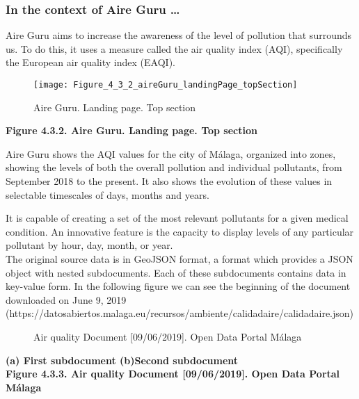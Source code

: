 \subsubsection*{In the context of Aire Guru \ldots} 

Aire Guru aims to increase the awareness of the level of pollution that surrounds us.
To do this, it uses a measure called the air quality index (AQI), specifically the European air quality index (EAQI).

\begin{figure}[ht]
    \centering
    \texttt{[image: Figure\_4\_3\_2\_aireGuru\_landingPage\_topSection]}
    \caption{Aire Guru. Landing page. Top section}
\end{figure}
\begin{center}
    \bf{        
    Figure 4.3.2. Aire Guru. Landing page. Top section}
\end{center}

Aire Guru shows the AQI values for the city of Málaga, organized into zones, showing the levels of both the overall pollution and individual pollutants, from September 2018 to the present.
It also shows the evolution of these values in selectable timescales of days, months and years.

It is capable of creating a set of the most relevant pollutants for a given medical condition.
An innovative feature is the capacity to display levels of any particular pollutant by hour, day, month, or year. \\

The original source data is in GeoJSON format, a format which provides a JSON object with nested subdocuments.
Each of these subdocuments contains data in key-value form.
In the following figure we can see the beginning of the document downloaded on June 9, 2019 (https://datosabiertos.malaga.eu/recursos/ambiente/calidadaire/calidadaire.json) \\

\begin{figure}[ht]
    \centering
    \hfill
    \caption{Air quality Document [09/06/2019]. Open Data Portal Málaga}
\end{figure}
    
\begin{center}
    \bf{        (a) First subdocument (b)Second subdocument \\
    Figure 4.3.3. Air quality Document [09/06/2019]. Open Data Portal Málaga}
\end{center}

